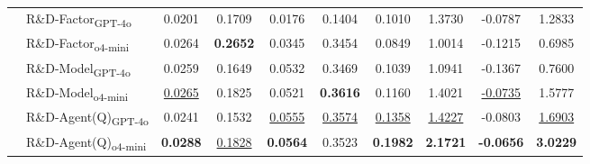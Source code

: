 \begin{table}[h]
{\begin{tabular}{llcccccccc}
& R\&D-Factor\textsubscript{GPT-4o} & \cellcolor{poor}0.0201 & \cellcolor{good}0.1709 & \cellcolor{worse}0.0176 & \cellcolor{worse}0.1404 & \cellcolor{good}0.1010 & \cellcolor{good}1.3730 & \cellcolor{good}-0.0787 & \cellcolor{good}1.2833 \\
& R\&D-Factor\textsubscript{o4-mini} & \cellcolor{good}0.0264 & \cellcolor{top1}\textbf{0.2652} & \cellcolor{poor}0.0345 & \cellcolor{good}0.3454 & \cellcolor{average}0.0849 & \cellcolor{average}1.0014 & \cellcolor{average}-0.1215 & \cellcolor{average}0.6985 \\
& R\&D-Model\textsubscript{GPT-4o} & \cellcolor{good}0.0259 & \cellcolor{average}0.1649 & \cellcolor{good}0.0532 & \cellcolor{good}0.3469 & \cellcolor{good}0.1039 & \cellcolor{good}1.0941 & \cellcolor{average}-0.1367 & \cellcolor{good}0.7600 \\
& R\&D-Model\textsubscript{o4-mini} & \cellcolor{top2}\uline{0.0265} & \cellcolor{good}0.1825 & \cellcolor{good}0.0521 & \cellcolor{top1}\textbf{0.3616} & \cellcolor{good}0.1160 & \cellcolor{good}1.4021 & \cellcolor{top2}\uline{-0.0735} & \cellcolor{good}1.5777 \\
& R\&D-Agent(Q)\textsubscript{GPT-4o} & \cellcolor{average}0.0241 & \cellcolor{average}0.1532 & \cellcolor{top2}\uline{0.0555} & \cellcolor{top2}\uline{0.3574} & \cellcolor{top2}\uline{0.1358} & \cellcolor{top2}\uline{1.4227} & \cellcolor{good}-0.0803 & \cellcolor{top2}\uline{1.6903} \\
& R\&D-Agent(Q)\textsubscript{o4-mini} & \cellcolor{top1}\textbf{0.0288} & \cellcolor{top2}\uline{0.1828} & \cellcolor{top1}\textbf{0.0564} & \cellcolor{good}0.3523 & \cellcolor{top1}\textbf{0.1982} & \cellcolor{top1}\textbf{2.1721} & \cellcolor{top1}\textbf{-0.0656} & \cellcolor{top1}\textbf{3.0229} \\
\bottomrule
\end{tabular}
}
\end{table}
